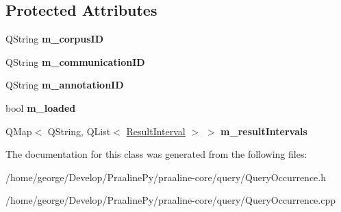 \subsection*{Protected Attributes}
\begin{DoxyCompactItemize}
\item 
\mbox{\label{class_query_occurrence_af93b8ec641ce59b172614a6564cf3337}} 
Q\+String {\bfseries m\+\_\+corpus\+ID}
\item 
\mbox{\label{class_query_occurrence_ae883ca1ddd18373126fd25b6d919cde3}} 
Q\+String {\bfseries m\+\_\+communication\+ID}
\item 
\mbox{\label{class_query_occurrence_a01aa9fa9264f8eab1810f7c5208584ee}} 
Q\+String {\bfseries m\+\_\+annotation\+ID}
\item 
\mbox{\label{class_query_occurrence_adced025014faae95d9d4b790767a30c3}} 
bool {\bfseries m\+\_\+loaded}
\item 
\mbox{\label{class_query_occurrence_a0ea76d2bf9c34e8c68ac88a178bf6376}} 
Q\+Map$<$ Q\+String, Q\+List$<$ \hyperlink{class_query_occurrence_1_1_result_interval}{Result\+Interval} $>$ $>$ {\bfseries m\+\_\+result\+Intervals}
\end{DoxyCompactItemize}


The documentation for this class was generated from the following files\+:\begin{DoxyCompactItemize}
\item 
/home/george/\+Develop/\+Praaline\+Py/praaline-\/core/query/Query\+Occurrence.\+h\item 
/home/george/\+Develop/\+Praaline\+Py/praaline-\/core/query/Query\+Occurrence.\+cpp\end{DoxyCompactItemize}
